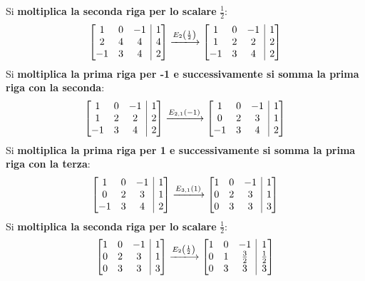 \documentclass[a4paper]{article}
\makeatletter
\newenvironment{rowequmatbra}[1]{\left[\array{@{}#1@{}}}{\endarray\right]}
\makeatother
\begin{document}
	Si \textbf{moltiplica la seconda riga per lo scalare} $\frac{1}{2}$:
	\begin{equation*}
		\begin{rowequmatbra}{ccc|c}
			1  & 0 & -1 & 1 \\
			2  & 4 &  4 & 4 \\
			-1 & 3 &  4 & 2
		\end{rowequmatbra} \xlongrightarrow{E_{2}\left(\frac{1}{2}\right)}
		\begin{rowequmatbra}{ccc|c}
			1  & 0 & -1 & 1 \\
			1  & 2 &  2 & 2 \\
			-1 & 3 &  4 & 2
		\end{rowequmatbra}
	\end{equation*}
	Si \textbf{moltiplica la prima riga per -1 e successivamente si somma la prima riga con la seconda}:
	\begin{equation*}
		\begin{rowequmatbra}{ccc|c}
			1  & 0 & -1 & 1 \\
			1  & 2 &  2 & 2 \\
			-1 & 3 &  4 & 2
		\end{rowequmatbra} \xlongrightarrow{E_{2,1}\left(-1\right)}
		\begin{rowequmatbra}{ccc|c}
			1  & 0 & -1 & 1 \\
			0  & 2 &  3 & 1 \\
			-1 & 3 &  4 & 2
		\end{rowequmatbra}
	\end{equation*}
	Si \textbf{moltiplica la prima riga per 1 e successivamente si somma la prima riga con la terza}:
	\begin{equation*}
		\begin{rowequmatbra}{ccc|c}
			1  & 0 & -1 & 1 \\
			0  & 2 &  3 & 1 \\
			-1 & 3 &  4 & 2
		\end{rowequmatbra} \xlongrightarrow{E_{3,1}\left(1\right)}
		\begin{rowequmatbra}{ccc|c}
			1  & 0 & -1 & 1 \\
			0  & 2 &  3 & 1 \\
			0  & 3 &  3 & 3
		\end{rowequmatbra}
	\end{equation*}
	Si \textbf{moltiplica la seconda riga per lo scalare} $\frac{1}{2}$:
	\begin{equation*}
		\begin{rowequmatbra}{ccc|c}
			1  & 0 & -1 & 1 \\
			0  & 2 &  3 & 1 \\
			0  & 3 &  3 & 3
		\end{rowequmatbra} \xlongrightarrow{E_{2}\left(\frac{1}{2}\right)}
		\begin{rowequmatbra}{ccc|c}
			1  & 0 & -1 & 1 \\
			0  & 1 &  \frac{3}{2} & \frac{1}{2} \\
			0  & 3 &  3 & 3
		\end{rowequmatbra}
	\end{equation*}
\end{document}
